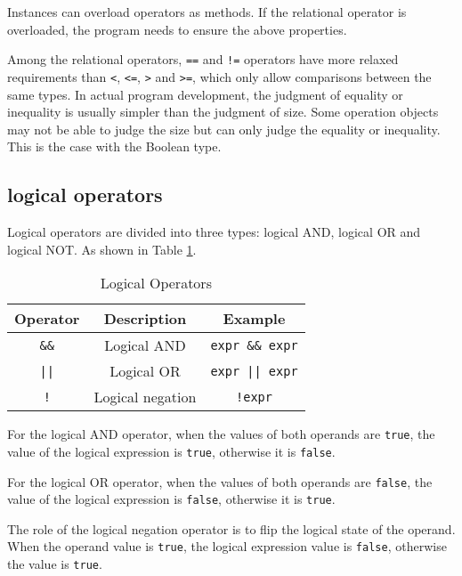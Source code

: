 Instances can overload operators as methods. If the relational operator is overloaded, the program needs to ensure the above properties.

Among the relational operators, \texttt{==} and \texttt{!=} operators have more relaxed requirements than \texttt{<}, \texttt{<=}, \texttt{>} and \texttt{>=}, which only allow comparisons between the same types. In actual program development, the judgment of equality or inequality is usually simpler than the judgment of size. Some operation objects may not be able to judge the size but can only judge the equality or inequality. This is the case with the Boolean type.

\subsection {logical operators}

Logical operators are divided into three types: logical AND, logical OR and logical NOT. As shown in Table \ref{tab::logic_operator}.

\begin{table}[htb]
    \centering
    \setlength{\tabcolsep}{10mm}
    \begin{tabular}{ccc} \toprule
        \textbf{Operator} & \textbf{Description} & \textbf{Example} \\ \midrule
        \texttt{\&\&} & Logical AND & \texttt{expr \&\& expr} \\
        \texttt{||} & Logical OR & \texttt{expr || expr} \\
        \texttt{!} & Logical negation & \texttt{!expr} \\
        \bottomrule
    \end{tabular}
    \caption{Logical Operators}
    \label{tab::logic_operator}
\end{table}

For the logical AND operator, when the values   of both operands are \texttt{true}, the value of the logical expression is \texttt{true}, otherwise it is \texttt{false}.

For the logical OR operator, when the values   of both operands are \texttt{false}, the value of the logical expression is \texttt{false}, otherwise it is \texttt{true}.

The role of the logical negation operator is to flip the logical state of the operand. When the operand value is \texttt{true}, the logical expression value is \texttt{false}, otherwise the value is \texttt{true}.

